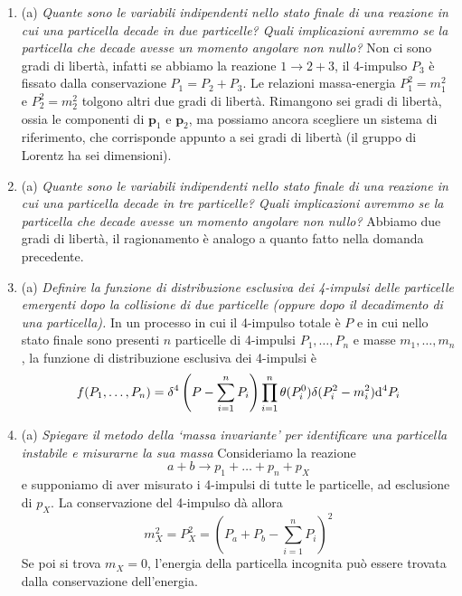 \documentclass{article}
\renewcommand{\a}{(a)}
\renewcommand{\t}[1]{\textit{ #1}}
\renewcommand{\vec}[1]{\mathbf{#1}}
\begin{document}
\begin{enumerate}
\item\a\t{Quante sono le variabili indipendenti nello stato finale di una reazione in cui una
	particella decade in due particelle? Quali implicazioni avremmo se la particella
	che decade avesse un momento angolare non nullo?} Non ci sono gradi di libertà, infatti se abbiamo la reazione $1\to2+3$, il 4-impulso $P_3$ è fissato dalla conservazione $P_1=P_2+P_3$. Le relazioni massa-energia $P^2_1=m^2_1$ e $P^2_2=m^2_2$ tolgono altri due gradi di libertà. Rimangono sei gradi di libertà, ossia le componenti di $\vec{p}_1$ e $\vec{p}_2$, ma possiamo ancora scegliere un sistema di riferimento, che corrisponde appunto a sei gradi di libertà (il gruppo di Lorentz ha sei dimensioni).
\item\a\t{Quante sono le variabili indipendenti nello stato finale di una reazione in cui una
	particella decade in tre particelle? Quali implicazioni avremmo se la particella
	che decade avesse un momento angolare non nullo?} Abbiamo due gradi di libertà, il ragionamento è analogo a quanto fatto nella domanda precedente.
\item\a\t{Definire la funzione di distribuzione esclusiva dei 4-impulsi delle particelle
	emergenti dopo la collisione di due particelle (oppure dopo il decadimento di una
	particella).} In un processo in cui il 4-impulso totale è $P$ e in cui nello stato finale sono presenti $n$ particelle di 4-impulsi $P_1,\dots, P_n$ e masse $m_1,\dots,m_n$, la funzione di distribuzione esclusiva dei 4-impulsi è
\[f(P_1,\dots,P_n)=\delta^4\left(P-\sum_{i=1}^{n}P_i\right)\prod_{i=1}^{n}\theta(P^0_i)\delta(P_i^2-m_i^2)\mathrm{d} ^4P_i\]
\item\a\t{Spiegare il metodo della ‘massa invariante’ per identificare una particella instabile
	e misurarne la sua massa} Consideriamo la reazione
\[a+b\to p_1+\dots+p_n+p_X\]
e supponiamo di aver misurato i 4-impulsi di tutte le particelle, ad esclusione di $p_X$. La conservazione del 4-impulso dà allora
\[m_X^2=P_X^2=\left(P_a+P_b-\sum_{i=1}^{n}P_i\right)^2\]
Se poi si trova $m_X=0$, l'energia della particella incognita può essere trovata dalla conservazione dell'energia.
\end{enumerate}
\end{document}
